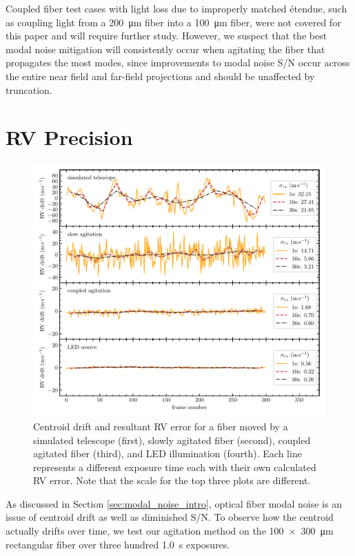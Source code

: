 Coupled fiber test cases with light loss due to improperly matched \'etendue, such as coupling light from a \SI{200}{\micro\meter} fiber into a \SI{100}{\micro\meter} fiber, were not covered for this paper and will require further study. However, we suspect that the best modal noise mitigation will consistently occur when agitating the fiber that propagates the most modes, since improvements to modal noise S/N occur across the entire near field and far-field projections and should be unaffected by truncation.

\section{RV Precision}
\label{sec:rv_precision}

\begin{figure}
\centering
	\includegraphics[width=\textwidth]{figures-2/rv_error.pdf}
	\caption[Radial velocity error with and without fiber agitation]{Centroid drift and resultant RV error for a fiber moved by a simulated telescope (first), slowly agitated fiber (second), coupled agitated fiber (third), and LED illumination (fourth). Each line represents a different exposure time each with their own calculated RV error. Note that the scale for the top three plots are different.}
\label{fig:rv_error}
\end{figure}

As discussed in Section \ref{sec:modal_noise_intro}, optical fiber modal noise is an issue of centroid drift as well as diminished S/N. To observe how the centroid actually drifts over time, we test our agitation method on the \SI{100x300}{\micro\meter} rectangular fiber over three hundred \SI{1.0}{\second} exposures.

